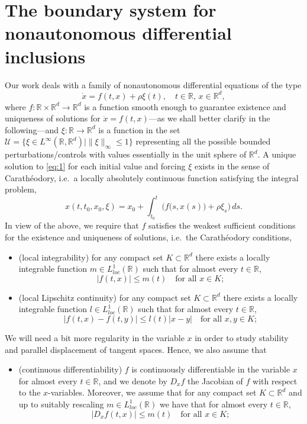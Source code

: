 \documentclass[reqno]{amsart}
\theoremstyle{definition}
\numberwithin{equation}{section}
\newcommand{\R}{\mathbb{R}}
\newcommand{\U}{\mathcal{U}}
\begin{document}
\section{The boundary system for nonautonomous differential inclusions}\label{sec:boundary-mapping-continuous}
Our work deals with %
a family of nonautonomous differential equations of the type
\begin{equation}\label{eq:1}
    \dot x = f(t,x) + \rho\xi(t),\quad t\in\R,\, x\in\R^d,
\end{equation}
where $f:\R \times \R^d\to\R^d$ is a function smooth enough to guarantee existence and uniqueness of solutions for $\dot x=f(t,x)$---as we shall better clarify in the following---and $\xi:\R\to\R^d$ is a function in the set $\U=\{\xi\in L^\infty(\R,\R^d)\mid \|\xi\|_\infty\le1\}$ representing all the possible bounded perturbations/controls with values essentially in the unit sphere of $\R^d$. A unique solution to \eqref{eq:1} for each initial value and forcing $\xi$ exists in the sense of Carathéodory, i.e.~a locally absolutely continuous function satisfying the integral problem,
\[
x(t,t_0,x_0,\xi)=x_0+\int_{t_0}^t\Big(f\big(s,x(s)\big)+\rho\xi_s\Big)\,ds.
\]
In view of the above, we require that $f$ satisfies the weakest sufficient conditions for the existence and uniqueness of solutions, i.e.~the Carath\'eodory conditions,
\begin{itemize}[leftmargin=*]
    \item (local integrability) for any compact set $K\subset\R^d$ there exists a locally integrable function $m\in L^1_{loc}(\R)$ such that for almost every $t\in\R$, \[|f(t,x)|\le m(t) \quad \text{for all }x\in K;\]
    \item (local Lipschitz continuity) for any compact set $K\subset\R^d$ there exists a locally integrable function $l\in L^1_{loc}(\R)$ such that for almost every $t\in\R$, 
    \[|f(t,x)-f(t,y)|\le l(t)|x-y| \quad \text{for all }x,y\in K;\]
\end{itemize}
We will need a bit more regularity in the variable $x$ in order to study stability and parallel displacement of tangent spaces. Hence, we also assume that 
\begin{itemize}[leftmargin=*]
    \item (continuous differentiability) $f$ is continuously differentiable in the variable $x$ for almost every $t\in\R$, and we  denote by $D_xf$ the Jacobian of $f$ with respect to the $x$-variables. Moreover, we assume that for any compact set $K\subset\R^d$ and up to suitably rescaling $m\in L^1_{loc}(\R)$ we have that for almost every $t\in\R$, \[|D_xf(t,x)|\le m(t) \quad \text{for all }x\in K;\]
\end{itemize}
\end{document}
